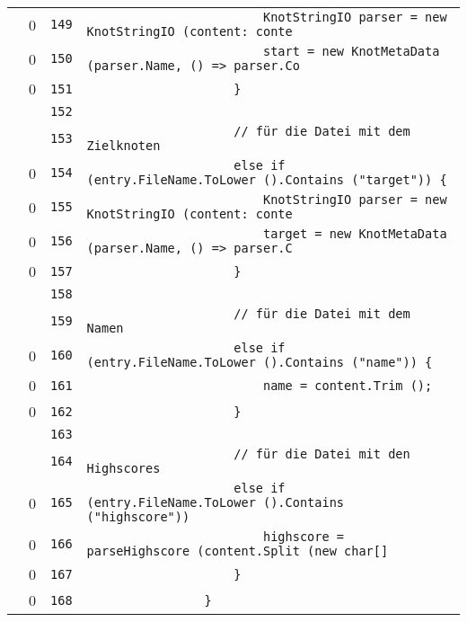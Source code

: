 \documentclass[a4paper,10pt]{article}
\begin{document}
\begin{longtable}[l]{lrrl}
\cellcolor{red} & 0 & \verb~149~ & \verb~                        KnotStringIO parser = new KnotStringIO (content: conte~\\
\cellcolor{red} & 0 & \verb~150~ & \verb~                        start = new KnotMetaData (parser.Name, () => parser.Co~\\
\cellcolor{red} & 0 & \verb~151~ & \verb~                    }~\\
\cellcolor{gray} &  & \verb~152~ & \verb~~\\
\cellcolor{gray} &  & \verb~153~ & \verb~                    // für die Datei mit dem Zielknoten~\\
\cellcolor{red} & 0 & \verb~154~ & \verb~                    else if (entry.FileName.ToLower ().Contains ("target")) {~\\
\cellcolor{red} & 0 & \verb~155~ & \verb~                        KnotStringIO parser = new KnotStringIO (content: conte~\\
\cellcolor{red} & 0 & \verb~156~ & \verb~                        target = new KnotMetaData (parser.Name, () => parser.C~\\
\cellcolor{red} & 0 & \verb~157~ & \verb~                    }~\\
\cellcolor{gray} &  & \verb~158~ & \verb~~\\
\cellcolor{gray} &  & \verb~159~ & \verb~                    // für die Datei mit dem Namen~\\
\cellcolor{red} & 0 & \verb~160~ & \verb~                    else if (entry.FileName.ToLower ().Contains ("name")) {~\\
\cellcolor{red} & 0 & \verb~161~ & \verb~                        name = content.Trim ();~\\
\cellcolor{red} & 0 & \verb~162~ & \verb~                    }~\\
\cellcolor{gray} &  & \verb~163~ & \verb~~\\
\cellcolor{gray} &  & \verb~164~ & \verb~                    // für die Datei mit den Highscores~\\
\cellcolor{red} & 0 & \verb~165~ & \verb~                    else if (entry.FileName.ToLower ().Contains ("highscore"))~\\
\cellcolor{red} & 0 & \verb~166~ & \verb~                        highscore = parseHighscore (content.Split (new char[] ~\\
\cellcolor{red} & 0 & \verb~167~ & \verb~                    }~\\
\cellcolor{red} & 0 & \verb~168~ & \verb~                }~\\

\end{longtable}
\end{document}
